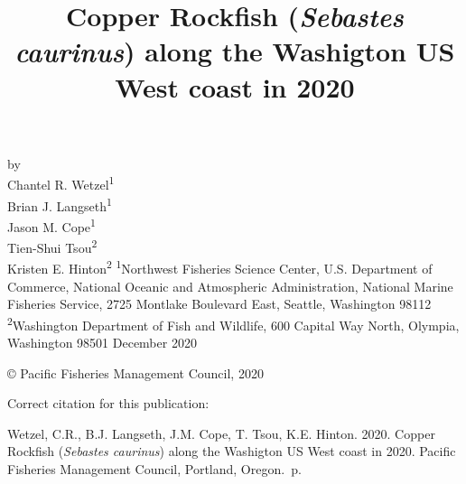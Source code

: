 \documentclass[11pt,
  english,
  a4paper,
]{article}
\date{}
\newcommand{\trTitle}{Copper Rockfish (\emph{Sebastes caurinus}) along the Washigton US West coast in 2020}
\newcommand{\trYear}{2020}
\newcommand{\trMonth}{December}
\newcommand{\trAuthsBack}{Wetzel, C.R., B.J. Langseth, J.M. Cope, T. Tsou, K.E. Hinton}
\newcommand{\trCitation}{
\begin{hangparas}{1em}{1}
\trAuthsBack{}. \trYear{}. \trTitle{}. Pacific Fisheries Management Council, Portland, Oregon. \pageref{LastPage}{}\,p.
\end{hangparas}}
\begin{document}

\renewcommand*{\thefootnote}{\fnsymbol{footnote}}

\small
\thispagestyle{empty}
\noindent
\begin{center}
\title{Copper Rockfish (\emph{Sebastes caurinus}) along the Washigton US West coast in 2020}
\vspace{1.5cm}
{\Large\textbf{}}
\vfill
by\\
Chantel R. Wetzel\textsuperscript{1}\\
Brian J. Langseth\textsuperscript{1}\\
Jason M. Cope\textsuperscript{1}\\
Tien-Shui Tsou\textsuperscript{2}\\
Kristen E. Hinton\textsuperscript{2}\vfill
\textsuperscript{1}Northwest Fisheries Science Center, U.S. Department of Commerce, National Oceanic and Atmospheric Administration, National Marine Fisheries Service, 2725 Montlake Boulevard East, Seattle, Washington 98112\\
\textsuperscript{2}Washington Department of Fish and Wildlife, 600 Capital Way North, Olympia, Washington 98501\vfill
\trMonth{} \trYear{}
\end{center}
\clearpage

\thispagestyle{empty}
\vspace*{\fill}
\begin{center}
\copyright{} Pacific Fisheries Management Council, \trYear{}\\
\end{center}
\par
\bigskip
\noindent
Correct citation for this publication:
\bigskip
\par
\trCitation{}
\clearpage


\tableofcontents\clearpage
\listoffigures \listoftables \clearpage
\label{TRlastRoman}
\clearpage

\newpage
\thispagestyle{empty} %

\pagestyle{plain}  %
\renewcommand*{\thefootnote}{\arabic{footnote}}  %
\setcounter{footnote}{0}  %
\renewcommand{\headrulewidth}{0.5pt}
\renewcommand{\footrulewidth}{0.5pt}
\end{document}
